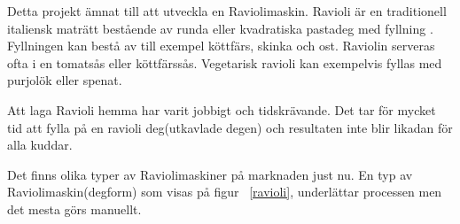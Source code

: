 Detta projekt ämnat till att utveckla en Raviolimaskin. Ravioli är en traditionell italiensk maträtt bestående av runda eller kvadratiska pastadeg med fyllning \cite{engproc}. Fyllningen kan bestå av till exempel köttfärs, skinka och ost. Raviolin serveras ofta i en tomatsås eller köttfärssås. Vegetarisk ravioli kan exempelvis fyllas med purjolök eller spenat.\medskip 

Att laga Ravioli hemma har varit jobbigt och tidskrävande. Det tar för mycket tid att fylla på en ravioli deg(utkavlade degen) och resultaten inte blir likadan för alla kuddar.\medskip 

Det finns olika typer av Raviolimaskiner på marknaden just nu. En typ av Raviolimaskin(degform) som visas på figur ~\ref{ravioli}, underlättar processen men det mesta görs manuellt.\medskip 

